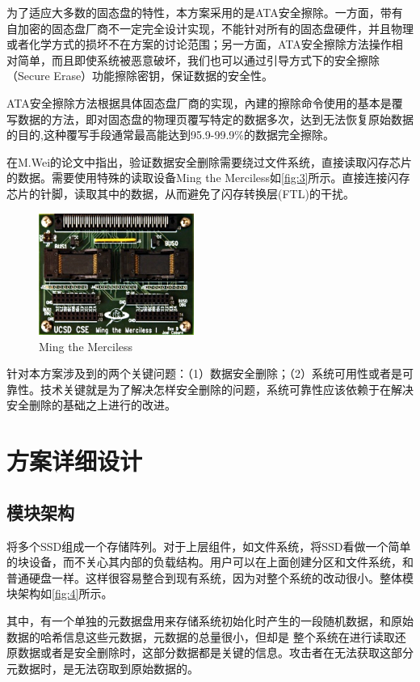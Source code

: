 为了适应大多数的固态盘的特性，本方案采用的是ATA安全擦除。一方面，带有自加密的固态盘厂商不一定完全设计实现，不能针对所有的固态盘硬件，并且物理或者化学方式的损坏不在方案的讨论范围；另一方面，ATA安全擦除方法操作相对简单，而且即使系统被恶意破坏，我们也可以通过引导方式下的安全擦除（Secure Erase）功能擦除密钥，保证数据的安全性。


ATA安全擦除方法根据具体固态盘厂商的实现，內建的擦除命令使用的基本是覆写数据的方法，即对固态盘的物理页覆写特定的数据多次，达到无法恢复原始数据的目的,这种覆写手段通常最高能达到95.9-99.9\%的数据完全擦除\cite{Wei2011Reliably}。


在M.Wei的论文\cite{Wei2011Reliably}中指出，验证数据安全删除需要绕过文件系统，直接读取闪存芯片的数据。需要使用特殊的读取设备Ming the Merciless如\autoref{fig:3}所示。直接连接闪存芯片的针脚，读取其中的数据，从而避免了闪存转换层(FTL)的干扰。
\begin{figure}[H]
	\centering
	\includegraphics[width=2in]{Pics/ming.png}
	\caption{Ming the Merciless}
    \label{fig:3}
\end{figure}
针对本方案涉及到的两个关键问题：（1）数据安全删除；（2）系统可用性或者是可靠性。技术关键就是为了解决怎样安全删除的问题，系统可靠性应该依赖于在解决安全删除的基础之上进行的改进。
\section{方案详细设计}
\subsection{模块架构}
将多个SSD组成一个存储阵列。对于上层组件，如文件系统，将SSD看做一个简单的块设备，而不关心其内部的负载结构。用户可以在上面创建分区和文件系统，和普通硬盘一样。这样很容易整合到现有系统，因为对整个系统的改动很小。整体模块架构如\autoref{fig:4}所示。


其中，有一个单独的元数据盘用来存储系统初始化时产生的一段随机数据，和原始数据的哈希信息这些元数据，元数据的总量很小，但却是
整个系统在进行读取还原数据或者是安全删除时，这部分数据都是关键的信息。攻击者在无法获取这部分元数据时，是无法窃取到原始数据的。


